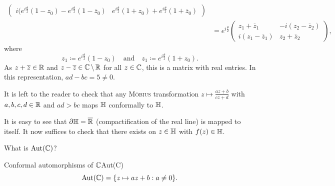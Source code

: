 \documentclass[a4paper,english]{article}
\begin{document}
\begin{pr}
\begin{align*}
\begin{pmatrix}
            i (e^{i \frac{\theta}{2}}(1 - z_0) - e^{i \frac{\theta}{2}} (1 - \overline{z}_0) & e^{i \frac{\theta}{2}} (1 + z_0) + e^{i \frac{\theta}{2}}(1 + \overline{z}_0) 
        \end{pmatrix} \\
        & = e^{i \frac{\theta}{2}} \begin{pmatrix}
            z_1 + \overline{z}_1 & - i(z_2 - \overline{z}_2) \\
            i (z_1 - \overline{z}_1) & z_2 + \overline{z}_2
        \end{pmatrix},
    \end{align*}
    where
    \begin{equation*}
        z_1
        \coloneqq e^{i \frac{\theta}{2}} (1 - z_0)
        \quad \text{and} \quad
        z_1
        \coloneqq e^{i \frac{\theta}{2}} (1 + z_0).
    \end{equation*}
    As $z + \overline{z} \in \operatorname{\mathbb{R}}$ and $z - \overline{z} \in \operatorname{\mathbb{C}} \setminus \operatorname{\mathbb{R}}$ for all $z \in \operatorname{\mathbb{C}}$, this is a matrix with real entries.
    In this representation, $a d - b c = 5 \ne 0$.
    
    It is left to the reader to check that any \textsc{Möbius} transformation $z \mapsto \frac{a z + b}{c z + d}$ with $a, b, c, d \in \operatorname{\mathbb{R}}$ and $a d > b c$ maps $\mathbb{H}$ conformally to $\mathbb{H}$.
    
    It is easy to see that $\partial \mathbb{H} = \overline{\operatorname{\mathbb{R}}}$ (compactification of the real line) is mapped to itself.
    It now suffices to check that there exists on $z \in \mathbb{H}$ with $f(z) \in \mathbb{H}$.
\end{pr}

What is $\operatorname{Aut}(\operatorname{\mathbb{C}})$?

\begin{thm}{Conformal automorphisms of $\operatorname{\mathbb{C}}$}{Aut(C)}
    \begin{equation*}
        \operatorname{Aut}(\operatorname{\mathbb{C}})
        = \{ z \mapsto a z + b: a \ne 0 \}.
    \end{equation*}
\end{thm}
\end{document}

